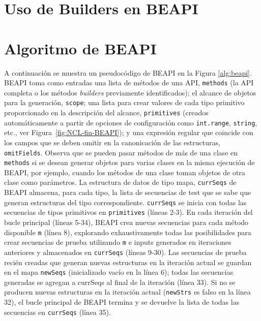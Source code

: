 \section{Uso de Builders en BEAPI}
\label{sec:builders}


\section{Algoritmo de BEAPI}
\label{sec:beapiTechnique}

A continuación se muestra un pseudocódigo de \textsf{BEAPI} en la Figura \ref{alg:beapi}. \textsf{BEAPI} toma como entradas una lista de métodos de una API,  \texttt{methods} (la API completa o los métodos \emph{builders} previamente identificados); el alcance de objetos para la generación, \texttt{scope}; una lista para crear valores de cada tipo primitivo proporcionado en la descripción del alcance, \texttt{primitives} (creados automáticamente a partir de opciones de configuración como \texttt{int.range}, \texttt{string}, etc., ver Figura~\ref{fig:NCL-fin-BEAPI}); y una expresión regular que coincide con los campos que se deben omitir en la canonicación de las estructuras, \texttt{omitFields}. Observa que se pueden pasar métodos de más de una clase en \texttt{methods} si se desean generar objetos para varias clases en la misma ejecución de \textsf{BEAPI}, por ejemplo, cuando los métodos de una clase toman objetos de otra clase como parámetros. La estructura de datos de tipo mapa, \texttt{currSeqs} de \textsf{BEAPI}  almacena, para cada tipo, la lista de secuencias de test que se sabe que generan estructuras del tipo correspondiente. \texttt{currSeqs} se inicia con todas las secuencias de tipos primitivos en \texttt{primitives} (líneas 2-3). En cada iteración del bucle principal (líneas 5-34), \textsf{BEAPI}  crea nuevas secuencias para cada método disponible \texttt{m} (línea 8), explorando exhaustivamente todas las posibilidades para crear secuencias de prueba utilizando \texttt{m} e inputs generados en iteraciones anteriores y almacenados en \texttt{currSeqs} (líneas 9-30). Las secuencias de prueba recién creadas que generan nuevas estructuras en la iteración actual se guardan en el mapa \texttt{newSeqs} (inicializado vacío en la línea 6); todas las secuencias generadas se agregan a currSeqs al final de la iteración (línea 33). Si no se producen nuevas estructuras en la iteración actual (\texttt{newStrs} es falso en la línea 32), el bucle principal de \textsf{BEAPI}  termina y se devuelve la lista de todas las secuencias en \texttt{currSeqs} (línea 35).


